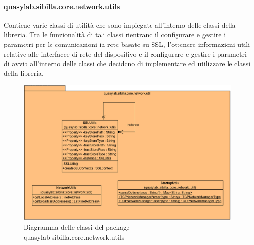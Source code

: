 \paragraph{quasylab.sibilla.core.network.utils} Contiene varie classi di utilità che sono impiegate all’interno delle classi della libreria. Tra le funzionalità di tali classi rientrano il configurare e gestire i parametri per le comunicazioni in rete basate su SSL, l’ottenere informazioni utili relative alle interfacce di rete del dispositivo e il configurare e gestire i parametri di avvio all’interno delle classi che decidono di implementare ed utilizzare le classi della libreria.

\begin{figure}[H]
    \includegraphics[width=\linewidth]{images/quasylab.sibilla.core.network.utils.png}
    \captionsetup{justification=centering}
    \caption{Diagramma delle classi del package quasylab.sibilla.core.network.utils}
  \end{figure}













